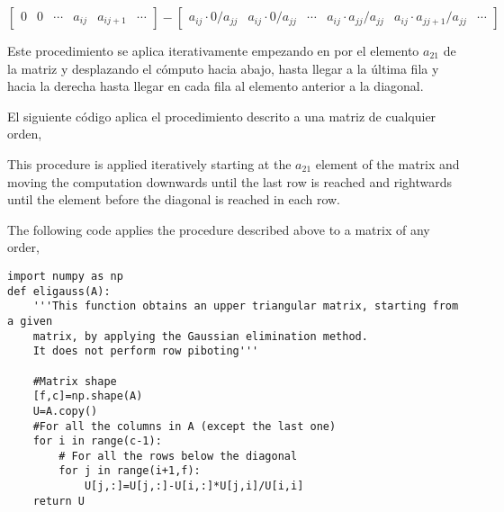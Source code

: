 \begin{equation}\label{eq:gauss-step3}
    \begin{bmatrix}
    0& 0& \cdots& a_{ij}& a_{ij+1}& \cdots
    \end{bmatrix}-\begin{bmatrix}
    a_{ij} \cdot 0/ a_{jj}& a_{ij} \cdot 0/ a_{jj}& \cdots & a_{ij} \cdot a_{jj}/ a_{jj}& a_{ij} \cdot a_{jj+1}/ a_{jj}& \cdots
\end{bmatrix}
\end{equation}
 
\begin{paracol}{2}

Este procedimiento se aplica iterativamente empezando en por el elemento  $a_{21}$ de la matriz y desplazando el cómputo hacia abajo, hasta llegar a la última fila y hacia la derecha hasta llegar en cada fila al elemento anterior a la diagonal.

El siguiente código aplica el procedimiento descrito a una matriz de cualquier orden,\label{cod: elig}

\switchcolumn

This procedure is applied iteratively starting at the $a_{21}$ element of the matrix and moving the computation downwards until the last row is reached and rightwards until the element before the diagonal is reached in each row.

The following code applies the procedure described above to a matrix of any order,\label{cod:elig}
\end{paracol}

\begin{verbatim}
import numpy as np
def eligauss(A):
    '''This function obtains an upper triangular matrix, starting from a given
    matrix, by applying the Gaussian elimination method.
    It does not perform row piboting'''
    
    #Matrix shape
    [f,c]=np.shape(A)
    U=A.copy()
    #For all the columns in A (except the last one)
    for i in range(c-1):
        # For all the rows below the diagonal
        for j in range(i+1,f):
            U[j,:]=U[j,:]-U[i,:]*U[j,i]/U[i,i]
    return U
\end{verbatim}

